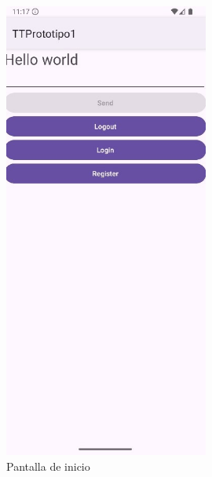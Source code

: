 \documentclass[a4paper,openright,12pt]{article}
\begin{document}
\begin{figure}[htp]
    \centering
    \begin{minipage}{0.3\textwidth}
        \centering
        \includegraphics[width=0.6\textwidth]{Images/Vista_It1.jpg} 
        \caption{Pantalla de inicio}
        \label{fig:Pantalla de inicio}
    \end{minipage}
    \hfill
    \begin{minipage}{0.3\textwidth}
        \centering

\end{minipage}
\end{figure}
\end{document}
